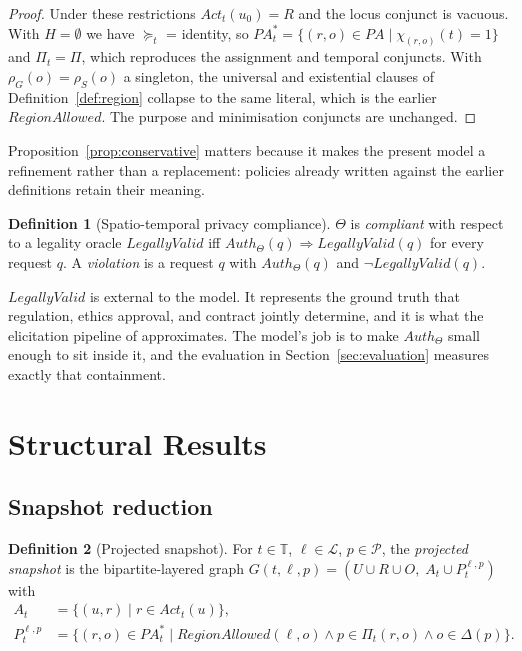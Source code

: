 \documentclass[11pt]{article}
\theoremstyle{definition}
\newtheorem{definition}{Definition}
\theoremstyle{plain}
\theoremstyle{remark}
\newcommand{\Auth}{\mathit{Auth}}
\newcommand{\RegionOK}{\mathit{RegionAllowed}}
\newcommand{\LegalOK}{\mathit{LegallyValid}}
\newcommand{\Act}{\mathit{Act}}
\newcommand{\Tdom}{\mathbb{T}}
\newcommand{\Ldom}{\mathcal{L}}
\newcommand{\Pdom}{\mathcal{P}}
\begin{document}
\begin{proof}
Under these restrictions $\Act_t(u_0) = R$ and the locus conjunct is vacuous.
With $H = \emptyset$ we have $\succeq_t$ = identity, so
$PA^{*}_t = \{(r,o) \in PA \mid \chi_{(r,o)}(t) = 1\}$ and
$\Pi_t = \Pi$, which reproduces the assignment and temporal conjuncts. With
$\rho_G(o) = \rho_S(o)$ a singleton, the universal and existential clauses of
Definition~\ref{def:region} collapse to the same literal, which is the earlier
$\RegionOK$. The purpose and minimisation conjuncts are unchanged.
\end{proof}

Proposition~\ref{prop:conservative} matters because it makes the present model
a refinement rather than a replacement: policies already written against the
earlier definitions retain their meaning.

\begin{definition}[Spatio-temporal privacy compliance]
$\Theta$ is \emph{compliant} with respect to a legality oracle $\LegalOK$ iff
$\Auth_\Theta(q) \Rightarrow \LegalOK(q)$ for every request $q$. A
\emph{violation} is a request $q$ with $\Auth_\Theta(q)$ and
$\neg\LegalOK(q)$.
\end{definition}

$\LegalOK$ is external to the model. It represents the ground truth that
regulation, ethics approval, and contract jointly determine, and it is what the
elicitation pipeline of \citet{kokash2026compliance} approximates. The model's
job is to make $\Auth_\Theta$ small enough to sit inside it, and the evaluation
in Section~\ref{sec:evaluation} measures exactly that containment.

\section{Structural Results}
\label{sec:results}

\subsection{Snapshot reduction}

\begin{definition}[Projected snapshot]
For $t \in \Tdom$, $\ell \in \Ldom$, $p \in \Pdom$, the \emph{projected
snapshot} is the bipartite-layered graph
$G(t,\ell,p) = (U \cup R \cup O,\; A_t \cup P_t^{\ell,p})$ with
\begin{align*}
  A_t &= \{(u,r) \mid r \in \Act_t(u)\}, \\
  P_t^{\ell,p} &= \bigl\{ (r,o) \in PA^{*}_t \;\big|\;
      \RegionOK(\ell,o) \land p \in \Pi_t(r,o) \land o \in \Delta(p) \bigr\}.
\end{align*}
\end{definition}
\end{document}
